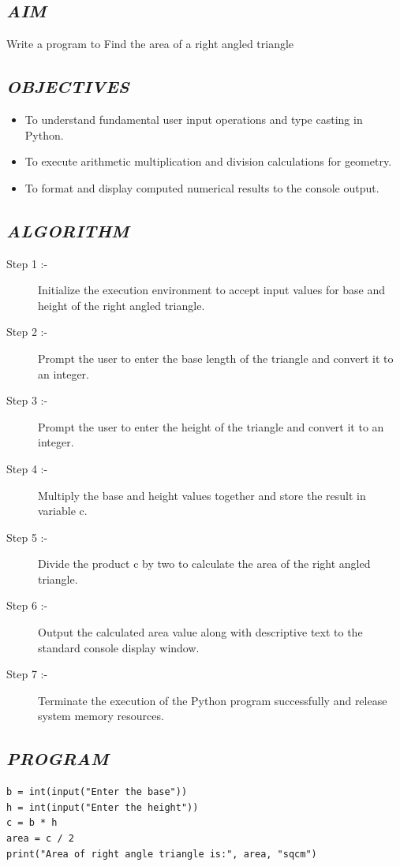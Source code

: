 \documentclass[11pt,a4paper]{article}
\begin{document}
\subsection*{\textit{AIM}}
Write a program to Find the area of a right angled triangle

\subsection*{\textit{OBJECTIVES}}
\begin{itemize}
  \item To understand fundamental user input operations and type casting in Python.
  \item To execute arithmetic multiplication and division calculations for geometry.
  \item To format and display computed numerical results to the console output.
\end{itemize}

\subsection*{\textit{ALGORITHM}}
\begin{description}
  \item[Step 1 :-] Initialize the execution environment to accept input values for base and height of the right angled triangle.
  \item[Step 2 :-] Prompt the user to enter the base length of the triangle and convert it to an integer.
  \item[Step 3 :-] Prompt the user to enter the height of the triangle and convert it to an integer.
  \item[Step 4 :-] Multiply the base and height values together and store the result in variable c.
  \item[Step 5 :-] Divide the product c by two to calculate the area of the right angled triangle.
  \item[Step 6 :-] Output the calculated area value along with descriptive text to the standard console display window.
  \item[Step 7 :-] Terminate the execution of the Python program successfully and release system memory resources.
\end{description}

\subsection*{\textit{PROGRAM}}
\begin{lstlisting}[style=pythonstyle]
b = int(input("Enter the base")) 
h = int(input("Enter the height")) 
c = b * h 
area = c / 2 
print("Area of right angle triangle is:", area, "sqcm")
\end{lstlisting}
\end{document}

